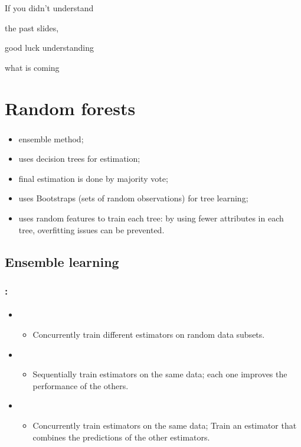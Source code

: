 \documentclass[xcolor=table]{beamer}
\begin{document}
\begin{frame}[plain]
	
	\begin{center}
		\Huge 
		If you didn't understand
		
		the past slides,
		
		good luck  understanding
		
		what is coming
	\end{center}
	
\end{frame}

\section{Random forests}

\begin{frame}
	\frametitle{\insertshortsubtitle}
	\framesubtitle{\insertsection}
	\begin{itemize}
		\item ensemble method;
		\item uses decision trees for estimation;
		\item final estimation is done by majority vote;
		\item uses Bootstraps (sets of random observations) for tree learning;
		\item uses random features to train each tree: by using fewer attributes in each tree, overfitting issues can be prevented.
	\end{itemize}
	
\end{frame}

\subsection{Ensemble learning}

\begin{frame}
	\frametitle{\insertshortsubtitle: \insertsection}
	\framesubtitle{\insertsubsection}
	
	\begin{itemize}
		\item {}
		\begin{itemize}
			\item Concurrently train different estimators on random data subsets.
		\end{itemize}
		\item {}
		\begin{itemize}
			\item Sequentially train estimators on the same data; each one improves the performance of the others.
		\end{itemize}
		\item {}
		\begin{itemize}
			\item Concurrently train estimators on the same data; Train an estimator that combines the predictions of the other estimators.
		\end{itemize}
	\end{itemize}
	
\end{frame}
\end{document}
